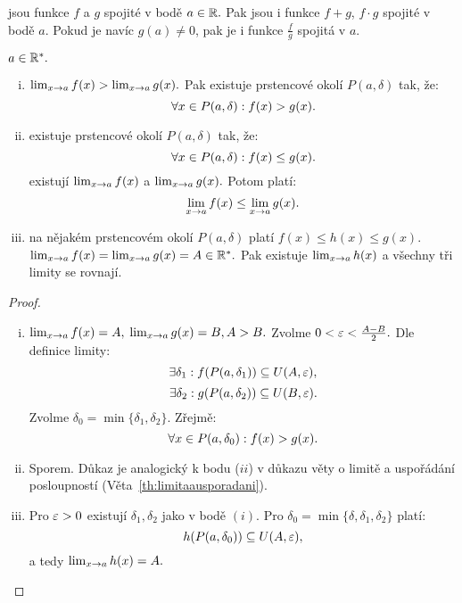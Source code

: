 \begin{corollary}
    \Necht jsou funkce $f$ a $g$ spojité v bodě $a \in \mathbb{R}.$ Pak jsou i 
    funkce $f + g$, $f\cdot g$ spojité v bodě $a.$ Pokud je navíc $g(a) \neq 0$,
    pak je i funkce $\frac{f}{g}$ spojitá v $a.$
\end{corollary}

\begin{theorem}
    \label{th:limitaausporadanifce}
    \Necht $a \in \mathbb{R}^*.$
    \begin{enumerate}[i.]
        \item \Necht $\lim_{x \to a} f(x) > \lim_{x \to a} g(x).$ Pak existuje prstencové
            okolí $P(a,\delta)$ tak, že:
            $$\forall x \in P(a,\delta): f(x) > g(x).$$

        \item \Necht existuje prstencové okolí $P(a, \delta)$ tak, že:
            $$\forall x \in P(a, \delta): f(x) \leq g(x).$$
            \Necht existují $\lim_{x \to a} f(x)$ a $\lim_{x \to a} g(x).$ Potom platí:
            $$\lim_{x \to a} f(x) \leq \lim_{x \to a} g(x).$$

        \item \Necht na nějakém prstencovém okolí $P(a, \delta)$ platí $f(x)
            \leq h(x) \leq g(x).$ \Necht $\lim_{x \to a} f(x) = \lim_{x \to a} g(x) = A 
            \in \mathbb{R}^*.$
            Pak existuje $\lim_{x \to a} h(x)$ a všechny tři limity se rovnají.
    \end{enumerate}
\end{theorem}

\begin{proof}
    \leavevmode
    \begin{enumerate}[i.]
        \item \Necht $\lim_{x \to a} f(x) = A,$ $\lim_{x \to a} g(x) = B, A > B.$ Zvolme
            $0 < \varepsilon < \frac{A-B}{2}.$ Dle definice limity:
            $$\exists \delta_1: f(P(a,\delta_1)) \subseteq U(A, \varepsilon),$$
            $$\exists \delta_2: g(P(a,\delta_2)) \subseteq U(B, \varepsilon).$$
            Zvolme $\delta_0 = \min\{\delta_1, \delta_2\}.$ Zřejmě:
            $$\forall x \in P(a,\delta_0): f(x) > g(x).$$

        \item Sporem. Důkaz je analogický k bodu ($ii$) v důkazu věty o 
            limitě a uspořádání posloupností (Věta~\ref{th:limitaausporadani}).

        \item Pro $\varepsilon > 0$ existují $\delta_1, \delta_2$ jako v bodě $(i)$. Pro
            $\delta_0 = \min\{\delta, \delta_1, \delta_2\}$ platí:
            $$h(P(a, \delta_0)) \subseteq U(A, \varepsilon),$$
            a tedy $\lim_{x \to a} h(x) = A.$

    \end{enumerate}
\end{proof}

